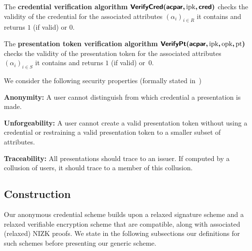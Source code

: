 \begin{compactitem}

\item The \textbf{credential verification algorithm 
$\bm{\mathsf{VerifyCred}(\mathsf{acpar},\allowbreak \text{ipk}, \mathsf{cred})}$} checks the validity of the 
credential for the associated attributes $(\alpha_i)_{i \in R}$ it contains and returns $1$ (if valid) or $0$.

\item The \textbf{presentation token verification algorithm 
$\bm{\mathsf{VerifyPt}(\mathsf{acpar},\allowbreak \text{ipk}, \text{opk}, \text{pt})}$} checks the validity of the 
presentation token for the associated attributes $(\alpha_i)_{i \in S}$ it contains and 
returns $1$ (if valid) or~$0$. \end{compactitem}

We consider the following security properties (formally stated 
in~\cite[Appendix G.1]{ISC:BosCamNev18})

\begin{compactitem}

\item \textbf{Anonymity:} A user cannot distinguish from which credential a 
presentation is made.

\item \textbf{Unforgeability:} A user cannot create a valid presentation 
token without using a credential or restraining a valid presentation 
token to a smaller subset of attributes.

\item \textbf{Traceability:} All presentations should trace to an issuer.
If computed by a collusion of users, it should trace to a member of this 
collusion.

\end{compactitem}




\subsection{Construction}

Our anonymous credential scheme builds upon a relaxed signature scheme and a 
relaxed verifiable encryption scheme that are compatible, along with 
associated (relaxed) NIZK proofs. We state in the following subsections our definitions 
for such schemes before presenting our generic scheme.

